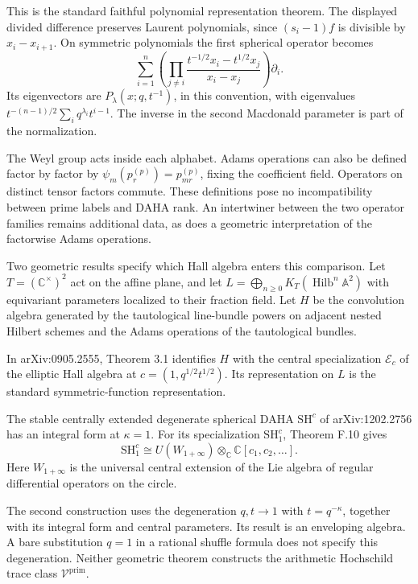 This is the standard faithful polynomial representation theorem.
The displayed divided difference preserves Laurent polynomials,
since $(s_i-1)f$ is divisible by $x_i-x_{i+1}$.
On symmetric polynomials the first spherical operator becomes
\[
 \sum_{i=1}^n
  \left(\prod_{j\ne i}
       \frac{t^{-1/2}x_i-t^{1/2}x_j}{x_i-x_j}\right)\partial_i.
\]
Its eigenvectors are $P_\lambda(x;q,t^{-1})$, in this convention,
with eigenvalues $t^{-(n-1)/2}\sum_iq^{\lambda_i}t^{i-1}$.
The inverse in the second Macdonald parameter is part of the
normalization.

\begin{remark}\label{v4-arith:obs:DAHA-Adams-incompatible}
The Weyl group acts inside each alphabet. Adams operations can
also be defined factor by factor by
$\psi_m(p_r^{(p)})=p_{mr}^{(p)}$, fixing the coefficient field.
Operators on distinct tensor factors commute. These definitions
pose no incompatibility between prime labels and DAHA rank.
An intertwiner between the two operator families remains additional
data, as does a geometric interpretation of the factorwise
Adams operations.
\end{remark}

Two geometric results specify which Hall algebra enters this
comparison. Let $T=(\mathbb C^\times)^2$ act on the affine plane,
and let $L=\bigoplus_{n\geq0}K_T(\operatorname{Hilb}^n\mathbb A^2)$
with equivariant parameters localized to their fraction field.
Let $H$ be the convolution algebra generated by the tautological
line-bundle powers on adjacent nested Hilbert schemes and the
Adams operations of the tautological bundles.

\begin{theorem}
\label{v4-arith:thm:SV-at-q-to-1}
In arXiv:0905.2555, Theorem 3.1 identifies $H$ with the central
specialization $\mathcal E_c$ of the elliptic Hall algebra at
$c=(1,q^{1/2}t^{1/2})$. Its representation on $L$ is the standard
symmetric-function representation.

The stable centrally extended degenerate spherical DAHA
$\mathrm{SH}^c$ of arXiv:1202.2756 has an integral form at
$\kappa=1$. For its specialization $\mathrm{SH}^c_1$,
Theorem F.10 gives
\[
 \mathrm{SH}^c_1\cong
 U(W_{1+\infty})\otimes_{\mathbb C}
                  \mathbb C[c_1,c_2,\ldots].
\]
Here $W_{1+\infty}$ is the universal central extension of the Lie
algebra of regular differential operators on the circle.
\end{theorem}

The second construction uses the degeneration
$q,t\longrightarrow1$ with $t=q^{-\kappa}$, together with its
integral form and central parameters. Its result is an enveloping
algebra. A bare substitution $q=1$ in a rational shuffle formula
does not specify this degeneration. Neither geometric theorem
constructs the arithmetic Hochschild trace class
$\mathcal V^{\mathrm{prim}}$.

